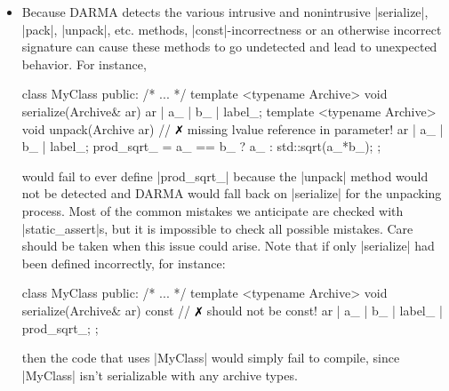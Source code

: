 \begin{itemize}
  \item Because DARMA detects the various intrusive and nonintrusive
  |serialize|, |pack|, |unpack|, etc. methods, |const|-incorrectness or an
  otherwise incorrect signature can cause these methods to go undetected and
  lead to unexpected behavior.  For instance,
\begin{CppCodeNumb}
class MyClass {
  public:
    /* ... */
    template <typename Archive>
    void serialize(Archive& ar) {
      ar | a_ | b_ | label_;
    }
    template <typename Archive>
    void unpack(Archive ar) { // $\no$ missing lvalue reference in parameter!
      ar | a_ | b_ | label_;
      prod_sqrt_ = a_ == b_ ? a_ : std::sqrt(a_*b_);
    }
};
\end{CppCodeNumb}
would fail to ever define |prod_sqrt_| because the |unpack| method would not be
detected and DARMA would fall back on |serialize| for the unpacking process. 
Most of the common mistakes we anticipate are checked with |static_assert|s, but
it is impossible to check all possible mistakes.  Care should be taken when this
issue could arise.  Note that if only |serialize| had been defined incorrectly,
for instance:
\begin{CppCodeNumb}
class MyClass {
  public:
    /* ... */
    template <typename Archive>
    void serialize(Archive& ar) const { // $\no$ should not be const!
      ar | a_ | b_ | label_ | prod_sqrt_;
    }
};
\end{CppCodeNumb}
then the code that uses |MyClass| would simply fail to compile, since |MyClass|
isn't serializable with any archive types.
\end{itemize}

\lstDeleteShortInline{\|}
